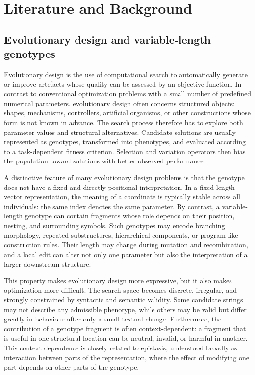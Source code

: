 \chapter{Literature and Background}

\section{Evolutionary design and variable-length genotypes}

Evolutionary design is the use of computational search to automatically generate or improve artefacts whose quality can be assessed by an objective function. In contrast to conventional optimization problems with a small number of predefined numerical parameters, evolutionary design often concerns structured objects: shapes, mechanisms, controllers, artificial organisms, or other constructions whose form is not known in advance. The search process therefore has to explore both parameter values and structural alternatives. Candidate solutions are usually represented as genotypes, transformed into phenotypes, and evaluated according to a task-dependent fitness criterion. Selection and variation operators then bias the population toward solutions with better observed performance. %

A distinctive feature of many evolutionary design problems is that the genotype does not have a fixed and directly positional interpretation. In a fixed-length vector representation, the meaning of a coordinate is typically stable across all individuals: the same index denotes the same parameter. By contrast, a variable-length genotype can contain fragments whose role depends on their position, nesting, and surrounding symbols. Such genotypes may encode branching morphology, repeated substructures, hierarchical components, or program-like construction rules. Their length may change during mutation and recombination, and a local edit can alter not only one parameter but also the interpretation of a larger downstream structure.

This property makes evolutionary design more expressive, but it also makes optimization more difficult. The search space becomes discrete, irregular, and strongly constrained by syntactic and semantic validity. Some candidate strings may not describe any admissible phenotype, while others may be valid but differ greatly in behaviour after only a small textual change. Furthermore, the contribution of a genotype fragment is often context-dependent: a fragment that is useful in one structural location can be neutral, invalid, or harmful in another. This context dependence is closely related to epistasis, understood broadly as interaction between parts of the representation, where the effect of modifying one part depends on other parts of the genotype. %

